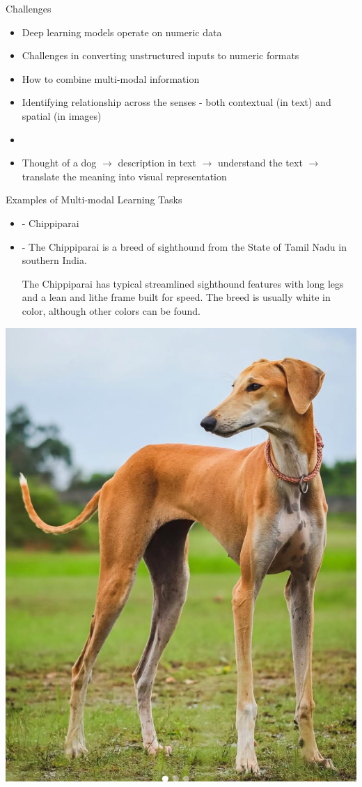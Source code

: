 \begin{frame}{Challenges}
    \begin{itemize}
        \item Deep learning models operate on numeric data
        \item Challenges in converting unstructured inputs to numeric formats
        \item How to combine multi-modal information
        \item Identifying relationship across the senses - both contextual (in text) and spatial (in images)
        \item[] 
        \item Thought of a dog $\rightarrow$ description in text $\rightarrow$ understand the text $\rightarrow$ translate the meaning into visual representation
    \end{itemize}
\end{frame}

\begin{frame}{Examples of Multi-modal Learning Tasks}
    \begin{multicols}{2}
        \begin{itemize}
            \item {} - Chippiparai
            \item {} - The Chippiparai is a breed of sighthound from the State of Tamil Nadu in southern India.

            The Chippiparai has typical streamlined sighthound features with long legs and a lean and lithe frame built for speed. The breed is usually white in color, although other colors can be found.
        \end{itemize}
        \vfill\null\columnbreak
        \includegraphics[width=0.7\linewidth]{Images/Chippiparai}

    \end{multicols}
\end{frame}

